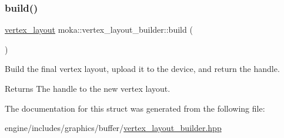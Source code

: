 \subsubsection{\texorpdfstring{build()}{build()}}
{\footnotesize\ttfamily \mbox{\hyperlink{classmoka_1_1vertex__layout}{vertex\+\_\+layout}} moka\+::vertex\+\_\+layout\+\_\+builder\+::build (\begin{DoxyParamCaption}{ }\end{DoxyParamCaption})}



Build the final vertex layout, upload it to the device, and return the handle. 

\begin{DoxyReturn}{Returns}
The handle to the new vertex layout. 
\end{DoxyReturn}


The documentation for this struct was generated from the following file\+:\begin{DoxyCompactItemize}
\item 
engine/includes/graphics/buffer/\mbox{\hyperlink{vertex__layout__builder_8hpp}{vertex\+\_\+layout\+\_\+builder.\+hpp}}\end{DoxyCompactItemize}
